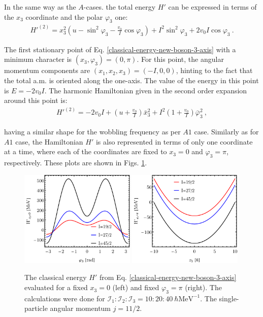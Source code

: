 In the same way as the $A$-cases. the total energy $H'$ can be expressed in terms of the $x_3$ coordinate and the polar $\varphi_3$ one:
\begin{align}
    H'^{(2)}=x_3^2\left(u-\sin^2\varphi_3-\frac{v_0}{I}\cos\varphi_3\right)+I^2\sin^2\varphi_3+2v_0I\cos\varphi_3\ .
    \label{classical-energy-new-boson-3-axis}
\end{align}

The first stationary point of Eq. \ref{classical-energy-new-boson-3-axis} with a minimum character is $(x_3,\varphi_3)=(0,\pi)$. For this point, the angular momentum components are $(x_1,x_2,x_3)=(-I,0,0)$, hinting to the fact that the total a.m. is oriented along the one-axis. The value of the energy in this point is $E=-2v_0I$. The harmonic Hamiltonian given in the second order expansion around this point is:
\begin{align}
    H'^{(2)}=-2v_0I+\left(u+\frac{v_0}{I}\right)\bar{x}_3^2+I^2\left(1+\frac{v_0}{I}\right)\bar{\varphi}_3^2\ ,
\end{align}

having a similar shape for the wobbling frequency as per $A1$ case. Similarly as for $A1$ case, the Hamiltonian $H'$ is also represented  in terms of only one coordinate at a time, where each of the coordinates are fixed to $x_3=0$ and $\varphi_3=\pi$, respectively. These plots are shown in Figs. \ref{energy-function-comparison-b1-case}.
\begin{figure}
    \centering
    \includegraphics[width=0.49\textwidth]{Chapters/Figures/Energy-Function-New-Boson-B1-x3-const.pdf}
    \includegraphics[width=0.49\textwidth]{Chapters/Figures/Energy-Function-New-Boson-B1-phi3-const.pdf}
    \caption{The classical energy $H'$ from Eq. \ref{classical-energy-new-boson-3-axis} evaluated for a fixed $x_3=0$ (left) and fixed $\varphi_3=\pi$ (right). The calculations were done for $\mathcal{I}_1:\mathcal{I}_2:\mathcal{I}_3=10:20:40\ \hbar\text{MeV}^{-1}$. The single-particle angular momentum $j=11/2$.}
    \label{energy-function-comparison-b1-case}
\end{figure}

